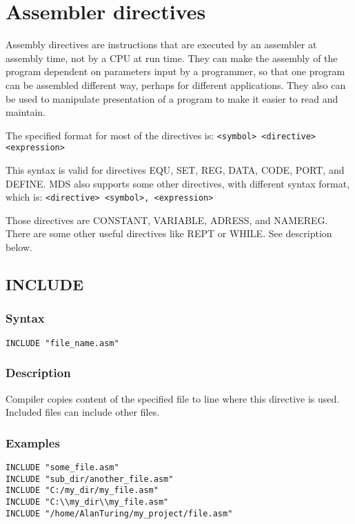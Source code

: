 \section{Assembler directives}
    Assembly directives are instructions that are executed by an assembler at assembly time, not by a CPU at run time. They can make the assembly of the program dependent on parameters input by a programmer, so that one program can be assembled different way, perhaps for different applications. They also can be used to manipulate presentation of a program to make it easier to read and maintain.

    The specified format for most of the directives is:
    {
        \usecodefont
        \verb'<symbol> <directive> <expression>'
    }

    \bigskip

    This syntax is valid for directives EQU, SET, REG, DATA, CODE, PORT, and DEFINE. MDS also supports some other directives, with different syntax format, which is:
    {
        \usecodefont
        \verb'<directive> <symbol>, <expression>'
    }

    \bigskip

    Those directives are CONSTANT, VARIABLE, ADRESS, and NAMEREG. There are some other useful directives like REPT or WHILE. See description below.

    \clearpage
    \subsection{INCLUDE}
        \subsubsection{Syntax}
            {
                \usecodefont
                \verb'INCLUDE "file_name.asm"'
            }

        \subsubsection{Description}
            Compiler copies content of the specified file to line where this directive is used. Included files can include other files.

        \subsubsection{Examples}
            {
                \usecodefont
                \verb'INCLUDE "some_file.asm"'\\
                \verb'INCLUDE "sub_dir/another_file.asm"'\\
                \verb'INCLUDE "C:/my_dir/my_file.asm"'\\
                \verb'INCLUDE "C:\\my_dir\\my_file.asm"'\\
                \verb'INCLUDE "/home/AlanTuring/my_project/file.asm"'\\
            }

